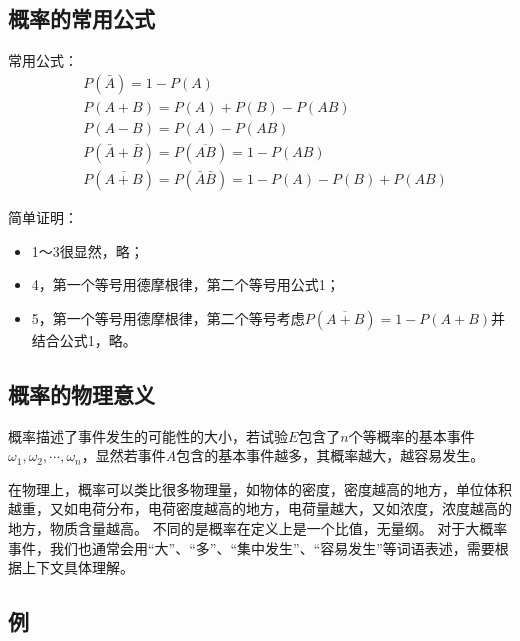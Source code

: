 \subsection{概率的常用公式}

常用公式：
\begin{align*}
& P\left( \bar{A} \right) =1-P\left( A \right) \\
& P\left( A+B \right) =P\left( A \right) +P\left( B \right) -P\left( AB \right) \\
& P\left( A-B \right) =P\left( A \right) -P\left( AB \right) \\
& P\left( \bar{A}+\bar{B} \right) =P\left( \overline{AB} \right) =1-P\left( AB \right) \\
& P\left( \overline{A+B} \right) =P\left( \bar{A}\bar{B} \right) =1-P\left( A \right) -P\left( B \right) +P\left( AB \right)
\end{align*}

简单证明：
\begin{itemize}
    \item 1～3很显然，略；
    \item 4，第一个等号用德摩根律，第二个等号用公式1；
    \item 5，第一个等号用德摩根律，第二个等号考虑$P\left( \overline{A+B} \right) =1-P\left( A+B \right) $并结合公式1，略。
\end{itemize}

\subsection{概率的物理意义}

概率描述了事件发生的可能性的大小，若试验$E$包含了$n$个等概率的基本事件$\omega _1,\omega _2,\cdots ,\omega _n$，显然若事件$A$包含的基本事件越多，其概率越大，越容易发生。

在物理上，概率可以类比很多物理量，如物体的密度，密度越高的地方，单位体积越重，又如电荷分布，电荷密度越高的地方，电荷量越大，又如浓度，浓度越高的地方，物质含量越高。
不同的是概率在定义上是一个比值，无量纲。
对于大概率事件，我们也通常会用“大”、“多”、“集中发生”、“容易发生”等词语表述，需要根据上下文具体理解。

\subsection{例}

